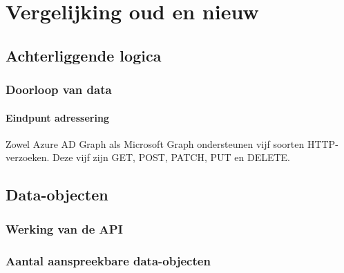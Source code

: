 
\chapter{Vergelijking oud en nieuw}%
\label{ch:vergelijking}

\section{Achterliggende logica}


\subsection{Doorloop van data}

\subsubsection{Eindpunt adressering}

Zowel Azure \ac{AD} Graph als Microsoft Graph ondersteunen vijf soorten \ac{HTTP}-verzoeken. Deze vijf zijn GET, POST, PATCH, PUT en DELETE.

\section{Data-objecten}

\subsection{Werking van de API}





\subsection{Aantal aanspreekbare data-objecten}

